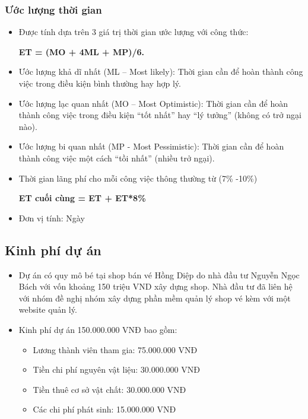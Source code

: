 \documentclass[12pt]{article}
\begin{document}
\subsubsection{Ước lượng thời gian}
\begin{itemize}[label=-, leftmargin=1cm]
    \item Được tính dựa trên 3 giá trị thời gian ước lượng với công thức:
        \begin{center}
            \textbf{ET = (MO + 4ML + MP)/6.}
        \end{center}
    \item Ước lượng khả dĩ nhất (ML – Most likely): Thời gian cần để hoàn thành công việc trong điều kiện bình thường hay hợp lý.
    \item Ước lượng lạc quan nhất (MO – Most Optimistic): Thời gian cần để hoàn thành công việc trong điều kiện “tốt nhất” hay “lý tưởng” (không có trở ngại nào).
    \item Ước lượng bi quan nhất (MP - Most Pessimistic): Thời gian cần để hoàn thành công việc một cách “tồi nhất” (nhiều trở ngại).
    \item Thời gian lãng phí cho mỗi công việc thông thường từ (7\% -10\%)
        \begin{center}
            \textbf{ET cuối cùng = ET + ET*8\%}
        \end{center}
    \item Đơn vị tính: Ngày
\end{itemize}

\subsection{Kinh phí dự án}
\begin{itemize}[label=-, leftmargin=1cm]
    \item Dự án có quy mô bé tại shop bán vé Hồng Diệp do nhà đầu tư Nguyễn Ngọc Bách với vốn khoảng 150 triệu VND xây dựng shop. Nhà đầu tư đã liên hệ với nhóm đề nghị nhóm xây dựng phần mềm quản lý shop vé kèm với một website quản lý.
    \item Kinh phí dự án 150.000.000 VNĐ bao gồm:
        \begin{itemize}[label=+, leftmargin=1cm]
            \item Lương thành viên tham gia: 75.000.000 VNĐ
            \item Tiền chi phí nguyên vật liệu: 30.000.000 VNĐ
            \item Tiền thuê cơ sở vật chất: 30.000.000 VNĐ
            \item Các chi phí phát sinh: 15.000.000 VNĐ
        \end{itemize}
\end{itemize}
\end{document}
